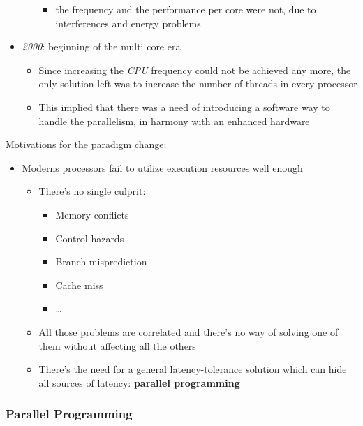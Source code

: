 \documentclass[english]{article}
\begin{document}
\begin{itemize}
\begin{itemize}
\begin{itemize}
                  \item the frequency and the performance per core were not, due to interferences and energy problems
                \end{itemize}
        \end{itemize}
  \item \textit{2000}: beginning of the multi core era
        \begin{itemize}
          \item Since increasing the \textit{CPU} frequency could not be achieved any more, the only solution left was to increase the number of threads in every processor
          \item This implied that there was a need of introducing a software way to handle the parallelism, in harmony with an enhanced hardware
        \end{itemize}
\end{itemize}

\bigskip
Motivations for the paradigm change:

\begin{itemize}
  \item Moderns processors fail to utilize execution resources well enough
        \begin{itemize}
          \item There's no single culprit:
                \begin{itemize}
                  \item Memory conflicts
                  \item Control hazards
                  \item Branch misprediction
                  \item Cache miss
                  \item \ldots
                \end{itemize}
          \item All those problems are correlated and there's no way of solving one of them without affecting all the others
          \item There's the need for a general latency-tolerance solution which can hide all sources of latency: \textbf{parallel programming}
        \end{itemize}
\end{itemize}

\subsubsection{Parallel Programming}
\end{document}
